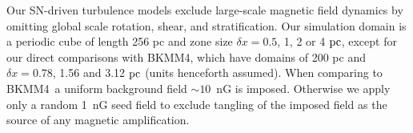 \documentclass[preprint2]{aastex63}
\newcommand\pc{~ {\rm pc}}
\newcommand\dx{ {\delta x}}
\newcommand\BKM{{\sf BKMM4}}
\newcommand{\fg}[1]{\textcolor{midgreen}{#1}}
\newcommand{\mm}[1]{\textcolor{mypurple}{#1}}
\begin{document}
\mm{Our} SN-driven turbulence models exclude large-scale
 magnetic field dynamics by \fg{omitting global scale} rotation, shear, and
 stratification.
 Our simulation domain is a periodic cube of length 256 pc and zone size
 $\dx=0.5$, 1, 2 or 4$\pc$\fg{, except for \mm{our} direct comparisons with
 \BKM, \mm{ which have} domains \mm{of} 200 pc and $\dx=0.78$, 1.56 and 3.12$\pc$ (units henceforth
 assumed)}.
 \fg{When comparing \mm{to} \BKM\ a uniform background field $\sim10$~nG is imposed.
 Otherwise we apply only a} random 1~nG seed field \fg{to} exclude tangling of
 \fg{the} imposed field as the source of any magnetic amplification.
\end{document}
